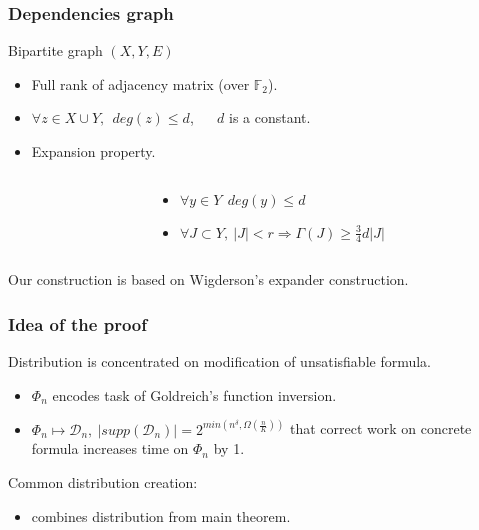 \begin{frame}
    \frametitle{Dependencies graph}

    Bipartite graph $(X, Y, E)$
    \pause
    \begin{itemize}
	    \item Full rank of adjacency matrix (over $\mathbb{F}_2$).
    	\pause
        \item $\forall z \in X \cup Y, ~~ deg(z) \le d$, ~~ $d$ is a constant.
    	\pause
        \item Expansion property.
    \end{itemize}

    \pause

    \begin{columns}
        \begin{column}{5cm}
            
        \end{column}

        \pause
        \pause
        \pause
        \begin{column}{5cm}
            \begin{itemize}
                \item $\forall y \in Y ~~ deg(y) \le d$
            	\pause
	            \item $\forall J \subset Y, ~
            		|J| < r \Rightarrow \Gamma(J) \ge \frac{3}{4}d|J|$
            \end{itemize}
		\end{column}
    \end{columns}

    \pause
    Our construction is based on Wigderson's expander construction.
\end{frame}

\begin{frame}
	\frametitle{Idea of the proof}

    \pause
    Distribution is concentrated on modification of unsatisfiable formula.
	\pause
    \begin{itemize}
        \item $\Phi_n$ encodes task of Goldreich's function inversion.
    	\pause
    	\item $\Phi_n \mapsto \mathcal{D}_n, ~ |supp(\mathcal{D}_n)| =
		    2^{min(n^\delta, \Omega(\frac{n}{K}))}$ that correct work
            on concrete formula increases time on $\Phi_n$ by 1.
	\end{itemize}

    \pause
    Common distribution creation:
    
    \pause
    \begin{itemize}
        \item combines distribution from main theorem.
    \end{itemize}
\end{frame}